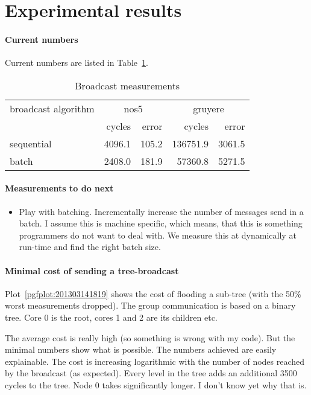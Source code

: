 \documentclass{article}
\begin{document}
\section{Experimental results}

\paragraph{Current numbers} Current numbers are listed in
Table~\ref{tab:bc_measurements}. 

\begin{table}[htb]
  \centering
  \begin{tabular}{lrrrr}
    \toprule
    broadcast algorithm & \multicolumn{2}{c}{nos5} & \multicolumn{2}{c}{gruyere} \\
      & cycles & error & cycles & error \\
    \midrule
    sequential &  4096.1 &  105.2 & 136751.9 &   3061.5 \\
    batch      &  2408.0 &  181.9 &  57360.8 &   5271.5 \\
    \bottomrule
  \end{tabular}
  \caption{Broadcast measurements}
  \label{tab:bc_measurements}
\end{table}

\paragraph{Measurements to do next} %
\begin{itemize}
\item Play with batching. Incrementally increase the number of
  messages send in a batch. I assume this is machine specific, which
  means, that this is something programmers do not want to deal
  with. We measure this at dynamically at run-time and find the right
  batch size.
\end{itemize}

\paragraph{Minimal cost of sending a tree-broadcast} %
Plot~\ref{pgfplot:201303141819} shows the cost of flooding a sub-tree
(with the 50\% worst measurements dropped). The group communication is
based on a binary tree. Core 0 is the root, cores 1 and 2 are its
children etc.

The average cost is really high (so something is wrong with my
code). But the minimal numbers show what is possible. The numbers
achieved are easily explainable. The cost is increasing
logarithmic with the number of nodes reached by the broadcast (as
expected). Every level in the tree adds an additional 3500 cycles to
the tree. Node 0 takes significantly longer. I don't know yet why that
is.
\end{document}
